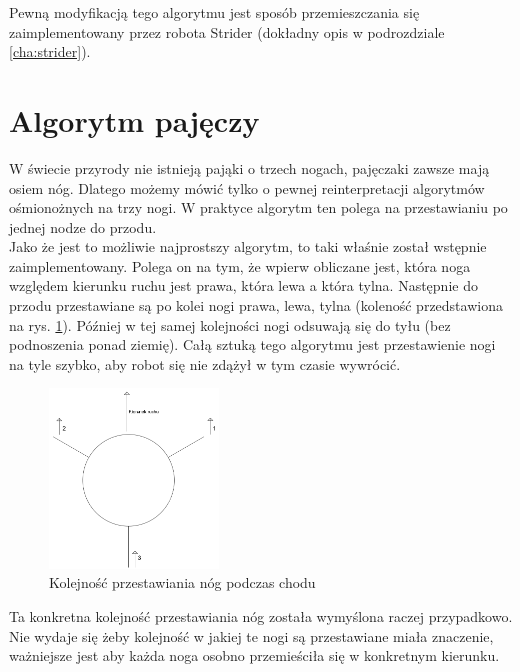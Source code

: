 Pewną modyfikacją tego algorytmu jest sposób przemieszczania się zaimplementowany przez robota Strider (dokładny opis w podrozdziale \ref{cha:strider}).\\

\section{Algorytm pajęczy}
W świecie przyrody nie istnieją pająki o trzech nogach, pajęczaki zawsze mają osiem nóg. Dlatego możemy mówić tylko o pewnej reinterpretacji algorytmów ośmionożnych na trzy nogi. W praktyce algorytm ten polega na przestawianiu po jednej nodze do przodu.\\

Jako że jest to możliwie najprostszy algorytm, to taki właśnie  został wstępnie zaimplementowany. Polega on na tym, że wpierw obliczane jest, która noga względem kierunku ruchu jest prawa, która lewa a która tylna. Następnie do przodu przestawiane są po kolei nogi prawa, lewa, tylna (koleność przedstawiona na rys. \ref{walking_schematic}). Później w tej samej kolejności nogi odsuwają się do tyłu (bez podnoszenia ponad ziemię). Całą sztuką tego algorytmu jest przestawienie nogi na tyle szybko, aby robot się nie zdążył w tym czasie wywrócić.\\

\begin{figure}[h!]
\includegraphics[width=0.4\textwidth]{img/walking_schematic.png}
\centering
\caption{Kolejność przestawiania nóg podczas chodu}
\label{walking_schematic}
\end{figure}

Ta konkretna kolejność przestawiania nóg została wymyślona raczej przypadkowo. Nie wydaje się żeby kolejność w jakiej te nogi są przestawiane miała znaczenie, ważniejsze jest aby każda noga osobno przemieściła się w konkretnym kierunku.\\

